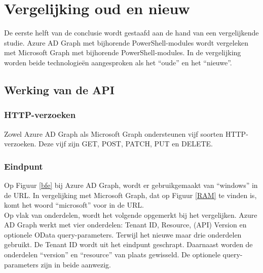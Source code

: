 
\chapter{Vergelijking oud en nieuw}%
\label{ch:vergelijking}

De eerste helft van de conclusie wordt gestaafd aan de hand van een vergelijkende studie. Azure \ac{AD} Graph met bijhorende PowerShell-modules wordt vergeleken met Microsoft Graph met bijhorende PowerShell-modules. In de vergelijking worden beide technologieën aangesproken als het “oude” en het “nieuwe”. 

\section{Werking van de API}


  

\subsection{HTTP-verzoeken}

Zowel Azure \ac{AD} Graph als Microsoft Graph ondersteunen vijf soorten \ac{HTTP}-verzoeken. Deze vijf zijn GET, POST, PATCH, PUT en DELETE. 

\subsection{Eindpunt}

Op Figuur \ref{bfe} bij Azure \ac{AD} Graph, wordt er gebruikgemaakt van “windows” in de \ac{URL}. In vergelijking met Microsoft Graph, dat op Figuur \ref{RAM} te vinden is, komt het woord “microsoft” voor in de \ac{URL}. \\

Op vlak van onderdelen, wordt het volgende opgemerkt bij het vergelijken. Azure \ac{AD} Graph werkt met vier onderdelen: Tenant ID, Resource, (\ac{API}) Version en optionele OData query-parameters. Terwijl het nieuwe maar drie onderdelen gebruikt. De Tenant ID wordt uit het eindpunt geschrapt. Daarnaast worden de onderdelen “version” en “resource” van plaats gewisseld. De optionele query-parameters zijn in beide aanwezig. 




